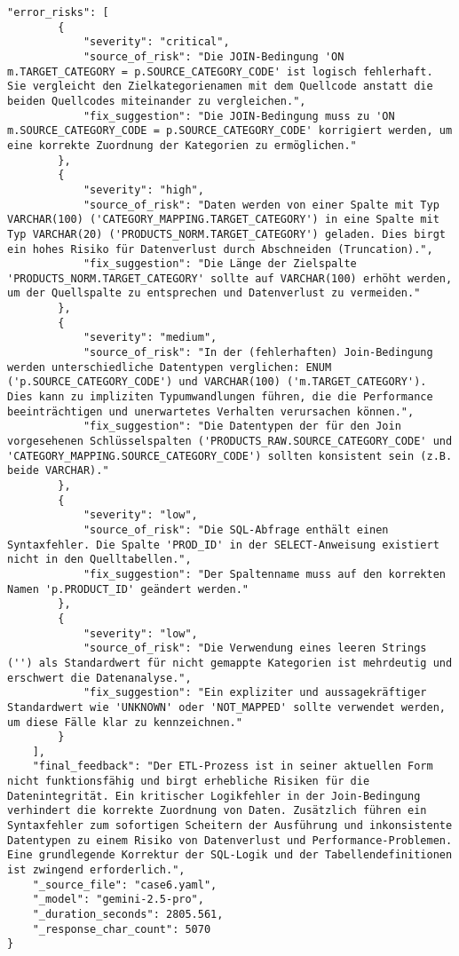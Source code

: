 \begin{lstlisting}[caption={Ausgabe: Gemini 2.5 Pro Anwendungsfall 6 Robustheitsdurchlauf},label={gemini_case6_prompt3}]
    "error_risks": [
        {
            "severity": "critical",
            "source_of_risk": "Die JOIN-Bedingung 'ON m.TARGET_CATEGORY = p.SOURCE_CATEGORY_CODE' ist logisch fehlerhaft. Sie vergleicht den Zielkategorienamen mit dem Quellcode anstatt die beiden Quellcodes miteinander zu vergleichen.",
            "fix_suggestion": "Die JOIN-Bedingung muss zu 'ON m.SOURCE_CATEGORY_CODE = p.SOURCE_CATEGORY_CODE' korrigiert werden, um eine korrekte Zuordnung der Kategorien zu ermöglichen."
        },
        {
            "severity": "high",
            "source_of_risk": "Daten werden von einer Spalte mit Typ VARCHAR(100) ('CATEGORY_MAPPING.TARGET_CATEGORY') in eine Spalte mit Typ VARCHAR(20) ('PRODUCTS_NORM.TARGET_CATEGORY') geladen. Dies birgt ein hohes Risiko für Datenverlust durch Abschneiden (Truncation).",
            "fix_suggestion": "Die Länge der Zielspalte 'PRODUCTS_NORM.TARGET_CATEGORY' sollte auf VARCHAR(100) erhöht werden, um der Quellspalte zu entsprechen und Datenverlust zu vermeiden."
        },
        {
            "severity": "medium",
            "source_of_risk": "In der (fehlerhaften) Join-Bedingung werden unterschiedliche Datentypen verglichen: ENUM ('p.SOURCE_CATEGORY_CODE') und VARCHAR(100) ('m.TARGET_CATEGORY'). Dies kann zu impliziten Typumwandlungen führen, die die Performance beeinträchtigen und unerwartetes Verhalten verursachen können.",
            "fix_suggestion": "Die Datentypen der für den Join vorgesehenen Schlüsselspalten ('PRODUCTS_RAW.SOURCE_CATEGORY_CODE' und 'CATEGORY_MAPPING.SOURCE_CATEGORY_CODE') sollten konsistent sein (z.B. beide VARCHAR)."
        },
        {
            "severity": "low",
            "source_of_risk": "Die SQL-Abfrage enthält einen Syntaxfehler. Die Spalte 'PROD_ID' in der SELECT-Anweisung existiert nicht in den Quelltabellen.",
            "fix_suggestion": "Der Spaltenname muss auf den korrekten Namen 'p.PRODUCT_ID' geändert werden."
        },
        {
            "severity": "low",
            "source_of_risk": "Die Verwendung eines leeren Strings ('') als Standardwert für nicht gemappte Kategorien ist mehrdeutig und erschwert die Datenanalyse.",
            "fix_suggestion": "Ein expliziter und aussagekräftiger Standardwert wie 'UNKNOWN' oder 'NOT_MAPPED' sollte verwendet werden, um diese Fälle klar zu kennzeichnen."
        }
    ],
    "final_feedback": "Der ETL-Prozess ist in seiner aktuellen Form nicht funktionsfähig und birgt erhebliche Risiken für die Datenintegrität. Ein kritischer Logikfehler in der Join-Bedingung verhindert die korrekte Zuordnung von Daten. Zusätzlich führen ein Syntaxfehler zum sofortigen Scheitern der Ausführung und inkonsistente Datentypen zu einem Risiko von Datenverlust und Performance-Problemen. Eine grundlegende Korrektur der SQL-Logik und der Tabellendefinitionen ist zwingend erforderlich.",
    "_source_file": "case6.yaml",
    "_model": "gemini-2.5-pro",
    "_duration_seconds": 2805.561,
    "_response_char_count": 5070
}
\end{lstlisting}


